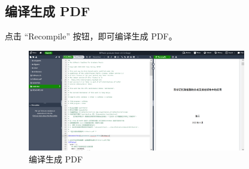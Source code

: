 \subsection{编译生成 PDF}

点击 ``Recompile'' 按钮，即可编译生成 PDF。

\begin{figure}[H]
  \begin{center}
    \includegraphics[width=0.85\textwidth]{imgs/overleaf-compile.png}
  \end{center}
  \caption{编译生成 PDF}
  \label{fig:overleaf-recompile}
\end{figure}

